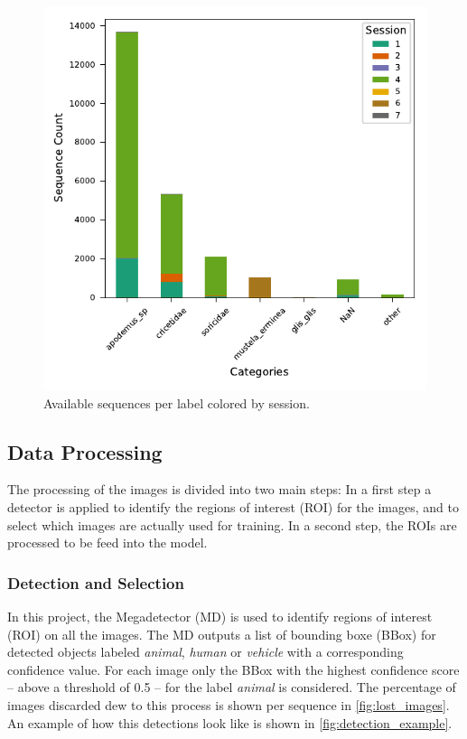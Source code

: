     \begin{figure}[ht]
    \centering
    \includegraphics{figures/label2_session.pdf}
    \caption{Available sequences per label colored by session.}
    \label{fig:sequenceperlabel}
    \end{figure}

    \subsection{Data Processing}

    The processing of the images is divided into two main steps: 
    In a first step a detector is applied to identify the regions of interest (ROI) for the images, and to select which images are actually used for training.
    In a second step, the ROIs are processed to be feed into the model.

        \subsubsection{Detection and Selection}
        
        In this project, the Megadetector (MD) \autocite{morrisEfficientPipelineCamera2025} is used to identify regions of interest (ROI) on all the images.
        The MD outputs a list of bounding boxe (BBox) for detected objects labeled \textit{animal}, \textit{human} or \textit{vehicle} with a corresponding confidence value.
        For each image only the BBox with the highest confidence score -- above a threshold of 0.5 -- for the label \textit{animal} is considered.
        The percentage of images discarded dew to this process is  shown per sequence in \autoref{fig:lost_images}.
        An example of how this detections look like is shown in \autoref{fig:detection_example}.

